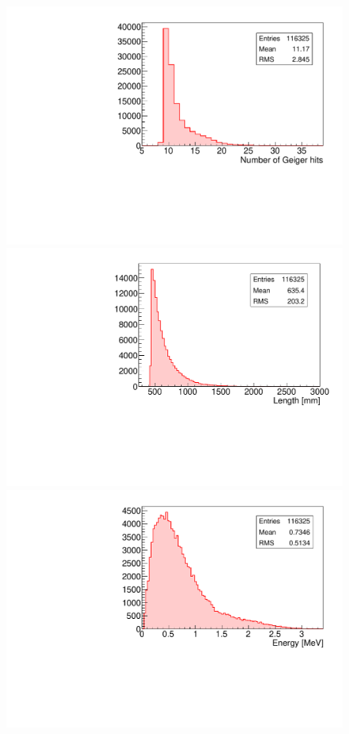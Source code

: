 \documentclass[main.tex]{subfiles}
\begin{document}
\begin{figure}[h!]
\begin{center}
\includegraphics[scale=0.32]{pictures/Chap5/source_selection_surface_gghits.pdf}
\includegraphics[scale=0.32]{pictures/Chap5/source_selection_surface_length.pdf}
\includegraphics[scale=0.32]{pictures/Chap5/source_selection_surface_energy.pdf}

\end{center}
\end{figure}
\end{document}
